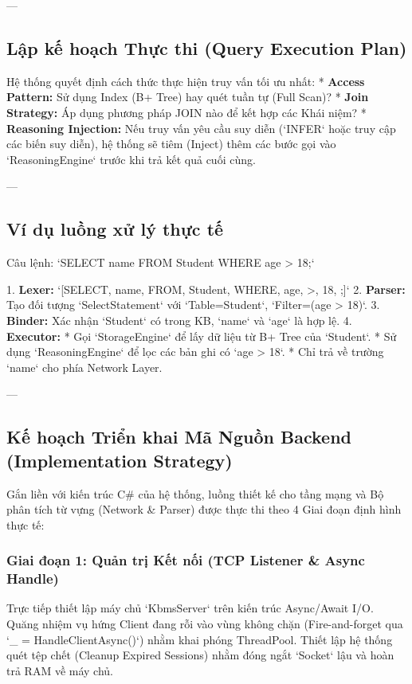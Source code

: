 ---

\subsection{Lập kế hoạch Thực thi (Query Execution Plan)}

Hệ thống quyết định cách thức thực hiện truy vấn tối ưu nhất:
*   \textbf{Access Pattern:} Sử dụng Index (B+ Tree) hay quét tuần tự (Full Scan)?
*   \textbf{Join Strategy:} Áp dụng phương pháp JOIN nào để kết hợp các Khái niệm?
*   \textbf{Reasoning Injection:} Nếu truy vấn yêu cầu suy diễn (`INFER` hoặc truy cập các biến suy diễn), hệ thống sẽ tiêm (Inject) thêm các bước gọi vào `ReasoningEngine` trước khi trả kết quả cuối cùng.

---

\subsection{Ví dụ luồng xử lý thực tế}

Câu lệnh: `SELECT name FROM Student WHERE age > 18;`

1.  \textbf{Lexer:} `[SELECT, name, FROM, Student, WHERE, age, >, 18, ;]`
2.  \textbf{Parser:} Tạo đối tượng `SelectStatement` với `Table=Student`, `Filter=(age > 18)`.
3.  \textbf{Binder:} Xác nhận `Student` có trong KB, `name` và `age` là hợp lệ.
4.  \textbf{Executor:}
    *   Gọi `StorageEngine` để lấy dữ liệu từ B+ Tree của `Student`.
    *   Sử dụng `ReasoningEngine` để lọc các bản ghi có `age > 18`.
    *   Chỉ trả về trường `name` cho phía Network Layer.

---

\subsection{Kế hoạch Triển khai Mã Nguồn Backend (Implementation Strategy)}

Gắn liền với kiến trúc C\# của hệ thống, luồng thiết kế cho tầng mạng và Bộ phân tích từ vựng (Network \& Parser) được thực thi theo 4 Giai đoạn định hình thực tế:

\subsubsection{Giai đoạn 1: Quản trị Kết nối (TCP Listener & Async Handle)}
Trực tiếp thiết lập máy chủ `KbmsServer` trên kiến trúc Async/Await I/O. Quăng nhiệm vụ hứng Client đang rỗi vào vùng không chặn (Fire-and-forget qua `\_ = HandleClientAsync()`) nhằm khai phóng ThreadPool. Thiết lập hệ thống quét tệp chết (Cleanup Expired Sessions) nhằm đóng ngắt `Socket` lậu và hoàn trả RAM về máy chủ.

